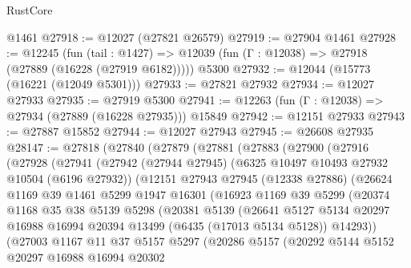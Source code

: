 \begin{lexlean}{RustCore}
\begin{coremodule}
    @1461
@27918 := @12027 (@27821 @26579)
@27919 := @27904 @1461
@27928 := @12245
    (fun (tail : @1427) => @12039 (fun (Γ : @12038) => @27918 (@27889 (@16228 (@27919 @6182)))))
    @5300
@27932 := @12044 (@15773 (@16221 (@12049 @5301)))
@27933 := @27821 @27932
@27934 := @12027 @27933
@27935 := @27919 @5300
@27941 := @12263 (fun (Γ : @12038) => @27934 (@27889 (@16228 @27935))) @15849
@27942 := @12151 @27933
@27943 := @27887 @15852
@27944 := @12027 @27943
@27945 := @26608 @27935
@28147 := @27818
    (@27840
      (@27879
        (@27881
          (@27883
            (@27900
              (@27916
                (@27928
                  (@27941
                    (@27942
                      (@27944 @27945)
                      (@6325 @10497 @10493 @27932 @10504 (@6196 @27932))
                      (@12151
                        @27943
                        @27945
                        (@12338 @27886)
                        (@26624
                          @1169
                          @39
                          @1461
                          @5299
                          @1947
                          @16301
                          (@16923
                            @1169
                            @39
                            @5299
                            (@20374
                              @1168
                              @35
                              @38
                              @5139
                              @5298
                              (@20381
                                @5139
                                (@26641
                                  @5127
                                  @5134
                                  @20297
                                  @16988
                                  @16994
                                  @20394
                                  @13499
                                  (@6435 (@17013 @5134 @5128))
                                  @14293))
                              (@27003
                                @1167
                                @11
                                @37
                                @5157
                                @5297
                                (@20286
                                  @5157
                                  (@20292
                                    @5144
                                    @5152
                                    @20297
                                    @16988
                                    @16994
                                    @20302

\end{coremodule}
\end{lexlean}
